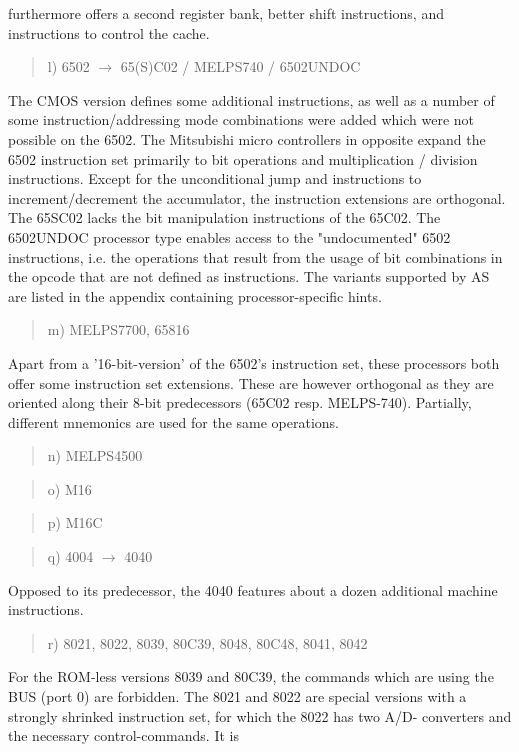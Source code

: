 \documentclass[12pt,twoside]{report}
\begin{document}
furthermore offers a second register bank, better shift instructions, and
instructions to control the cache.
\begin{quote}
l) 6502 $\rightarrow$ 65(S)C02 / MELPS740 / 6502UNDOC
\end{quote}
The CMOS version defines some additional instructions, as well as a number of
some instruction/addressing mode combinations were added which were not
possible on the 6502.  The Mitsubishi micro controllers in opposite expand
the 6502 instruction set primarily to bit operations and multiplication /
division instructions.  Except for the unconditional jump and instructions
to increment/decrement the accumulator, the instruction extensions are
orthogonal.  The 65SC02 lacks the bit manipulation instructions of the
65C02.  The 6502UNDOC processor type enables access to the "undocumented"
6502 instructions, i.e. the operations that result from the usage of bit
combinations in the opcode that are not defined as instructions.  The 
variants supported by AS are listed in the appendix containing processor-specific
hints.
\begin{quote}
m) MELPS7700, 65816
\end{quote}
Apart from a '16-bit-version' of the 6502's instruction set, these
processors both offer some instruction set extensions.  These are
however orthogonal as they are oriented along their 8-bit
predecessors (65C02 resp. MELPS-740).  Partially, different
mnemonics are used for the same operations.
\begin{quote}
n) MELPS4500
\end{quote}
\begin{quote}
o) M16
\end{quote}
\begin{quote}
p) M16C
\end{quote}
\begin{quote}
q) 4004 $\rightarrow$ 4040
\end{quote}
Opposed to its predecessor, the 4040 features about a dozen additional
machine instructions.
\begin{quote}
r) 8021, 8022, 8039, 80C39, 8048, 80C48, 8041, 8042
\end{quote}
For the ROM-less versions 8039 and 80C39, the commands which are
using the BUS (port 0) are forbidden.  The 8021 and 8022 are special
versions with a strongly shrinked instruction set, for which the 8022
has two A/D- converters and the necessary control-commands.  It is
\end{document}
